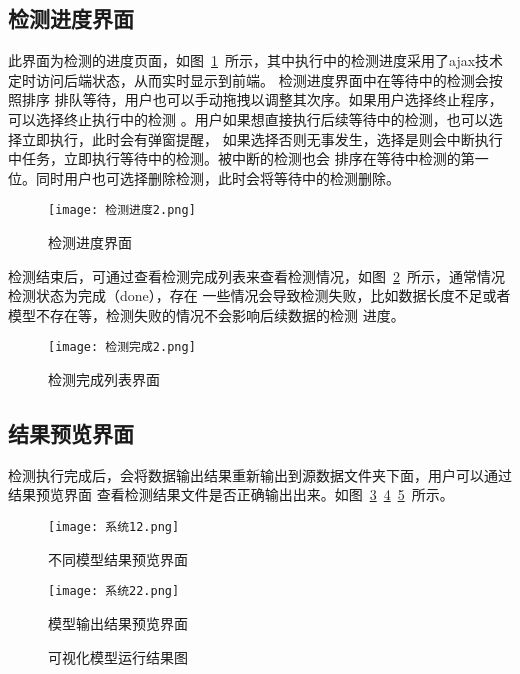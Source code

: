 \subsection{检测进度界面}
此界面为检测的进度页面，如图~\ref{fig:sys-missjd}~所示，其中执行中的检测进度采用了ajax技术定时访问后端状态，从而实时显示到前端。
检测进度界面中在等待中的检测会按照排序
排队等待，用户也可以手动拖拽以调整其次序。如果用户选择终止程序，可以选择终止执行中的检测
。用户如果想直接执行后续等待中的检测，也可以选择立即执行，此时会有弹窗提醒，
如果选择否则无事发生，选择是则会中断执行中任务，立即执行等待中的检测。被中断的检测也会
排序在等待中检测的第一位。同时用户也可选择删除检测，此时会将等待中的检测删除。
\begin{figure}[h]
	\centering
	\texttt{[image: 检测进度2.png]}
	\caption{检测进度界面}
	\label{fig:sys-missjd}
\end{figure}

检测结束后，可通过查看检测完成列表来查看检测情况，如图~\ref{fig:sys-missdone}~所示，通常情况检测状态为完成（done），存在
一些情况会导致检测失败，比如数据长度不足或者模型不存在等，检测失败的情况不会影响后续数据的检测
进度。
\begin{figure}[h]
	\centering
	\texttt{[image: 检测完成2.png]}
	\caption{检测完成列表界面}
	\label{fig:sys-missdone}
\end{figure}

\subsection{结果预览界面}
检测执行完成后，会将数据输出结果重新输出到源数据文件夹下面，用户可以通过结果预览界面
查看检测结果文件是否正确输出出来。如图~\ref{fig:sys-1}~\ref{fig:sys-2}~\ref{fig:vis-ans}~所示。
\begin{figure}[h]
	\centering
	\texttt{[image: 系统12.png]}
	\caption{不同模型结果预览界面}
	\label{fig:sys-1}
\end{figure}

\begin{figure}[h]
	\centering
	\texttt{[image: 系统22.png]}
	\caption{模型输出结果预览界面}
	\label{fig:sys-2}
\end{figure}

\begin{figure}[h]
	\centering
	\caption{可视化模型运行结果图}
	\label{fig:vis-ans}
\end{figure}


